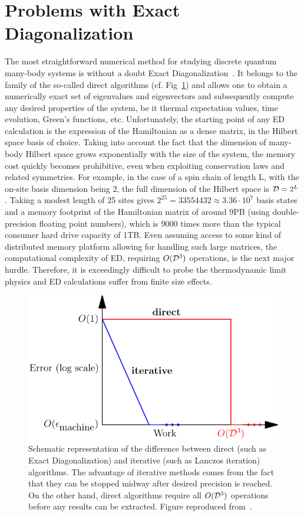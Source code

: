 \section{Problems with Exact Diagonalization}
The most straightforward numerical method for studying discrete quantum many-body systems is without a doubt
Exact Diagonalization~\autocite{Weisse2008}. It belongs to the family of the so-called direct algorithms (cf. Fig~\ref{fig:direct_iter})
and allows one to obtain a numerically exact set of eigenvalues and eigenvectors and subsequently compute any desired properties
of the system, be it thermal expectation values, time evolution, Green's functions, etc. Unfortunately, the starting point of any
ED calculation is the expression of the Hamiltonian as a dense matrix, in the Hilbert space basis of choice. Taking into account
the fact that the dimension of many-body Hilbert space grows exponentially with the size of the system, the memory cost quickly becomes
prohibitive, even when exploiting conservation laws and related symmetries. For example, in the case of a spin chain of length L, with
the on-site basis dimension being 2, the full dimension of the Hilbert space is \(\mathcal{D} = 2^{L}\). Taking a modest length of 25 sites gives
\(2^{25} = 33554432\approx 3.36 \cdot 10^7\) basis states and a memory footprint of the Hamiltonian matrix of around 9PB (using double-precision
floating point numbers), which is 9000 times more than the typical consumer hard drive capacity of 1TB. Even assuming access to some kind of distributed
memory platform allowing for handling such large matrices, the computational complexity of ED, requiring \(O(\mathcal{D}^3)\) operations,
is the next major hurdle. Therefore, it is exceedingly
difficult to probe the thermodynamic limit physics and ED calculations suffer from finite size effects.
\begin{figure}[htbp]
	\centering
	\includegraphics[width=0.75\linewidth]{Figures/direct_iterative.pdf}
	\caption{Schematic representation of the difference between direct (such as Exact Diagonalization) and
		iterative (such as Lanczos iteration) algorithms. The advantage of iterative methods comes from the fact that they
		can be stopped midway after desired precision is reached. On the other hand, direct algorithms require all \(O(\mathcal{D}^3)\)
		operations before any results can be extracted. Figure reproduced from~\textcite{Trefethen1997}.}
	\label{fig:direct_iter}
\end{figure}
